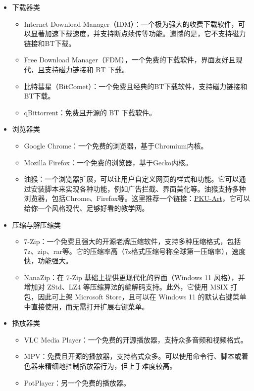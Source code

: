 \documentclass[../main.tex]{subfiles}
\begin{document}
\begin{itemize}
  \item 下载器类
    \begin{itemize}
      \item Internet Download Manager（IDM）：一个极为强大的收费下载软件，可以显著加速下载速度，并支持断点续传等功能。遗憾的是，它不支持磁力链接和BT下载。
      \item Free Download Manager（FDM），一个免费的下载软件，界面友好且现代，且支持磁力链接和 BT 下载。
      \item 比特彗星（BitComet）：一个免费且经典的BT下载软件，支持磁力链接和BT下载。
      \item qBittorrent：免费且开源的 BT 下载软件。
    \end{itemize}
  \item 浏览器类
    \begin{itemize}
      \item Google Chrome：一个免费的浏览器，基于Chromium内核。
      \item Mozilla Firefox：一个免费的浏览器，基于Gecko内核。
      \item 油猴：一个浏览器扩展，可以让用户自定义网页的样式和功能。它可以通过安装脚本来实现各种功能，例如广告拦截、界面美化等。油猴支持多种浏览器，包括Chrome、Firefox等。这里推荐一个链接：\href{https://github.com/zhuozhiyongde/PKU-Art}{PKU-Art}，它可以给你一个风格现代、足够好看的教学网。
    \end{itemize}
  \item 压缩与解压缩类
    \begin{itemize}
      \item 7-Zip：一个免费且强大的开源老牌压缩软件，支持多种压缩格式，包括7z、zip、rar等。它的压缩率高（7z格式压缩号称全球第一压缩率），速度快，功能强大。
      \item NanaZip：在 7-Zip 基础上提供更现代化的界面（Windows 11 风格），并增加对 ZStd、LZ4 等压缩算法的编解码支持。此外，它使用 MSIX 打包，因此可上架 Microsoft Store，且可以在 Windows 11 的默认右键菜单中直接使用，而无需打开扩展右键菜单。
    \end{itemize}
  \item 播放器类
    \begin{itemize}
      \item VLC Media Player：一个免费的开源播放器，支持众多音频和视频格式。
      \item MPV：免费且开源的播放器，支持格式众多。可以使用命令行、脚本或着色器来精细地控制播放器行为，但上手难度较高。
      \item PotPlayer：另一个免费的播放器。

\end{itemize}
\end{itemize}
\end{document}
